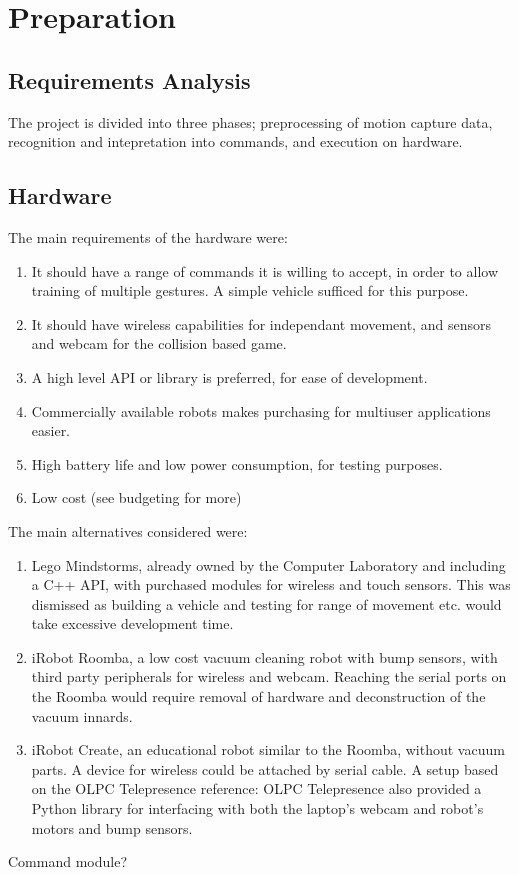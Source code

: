 \documentclass[12pt,a4,notitlepage]{report}
\renewcommand{\_}{\texttt{\symbol{95}}}
\newcommand{\<}{\texttt{\symbol{60}}}
\renewcommand{\>}{\texttt{\symbol{62}}}
\begin{document}
\chapter{Preparation}

\section{Requirements Analysis}

The project is divided into three phases; preprocessing of motion capture data, recognition and intepretation into commands, and execution on hardware. 

\section{Hardware}

The main requirements of the hardware were:

\begin{enumerate}
\item It should  have a range of commands it is willing to accept, in order to allow training of multiple gestures. A simple vehicle sufficed for this purpose.
\item It should have wireless capabilities for independant movement, and sensors and webcam for the collision based game.
\item A high level API or library is preferred, for ease of development.
\item Commercially available robots makes purchasing for multiuser applications easier.
\item High battery life and low power consumption, for testing purposes.
\item Low cost (see budgeting for more)
\end{enumerate}

The main alternatives considered were:
\begin{enumerate}
\item Lego Mindstorms, already owned by the Computer Laboratory and including a C++ API, with purchased modules for wireless and touch sensors. This was dismissed as building a vehicle and testing for range of movement etc. would take excessive development time.
\item iRobot Roomba, a low cost vacuum cleaning robot with bump sensors, with third party peripherals for wireless and webcam. Reaching the serial ports on the Roomba would require removal of hardware and deconstruction of the vacuum innards.
\item iRobot Create, an educational robot similar to the Roomba, without vacuum parts. A device for wireless could be attached by serial cable. A setup based on the OLPC Telepresence {reference: OLPC Telepresence} also provided a Python library for interfacing with both the laptop's webcam and robot's motors and bump sensors.
\end{enumerate}
{Command module?}
\end{document}
